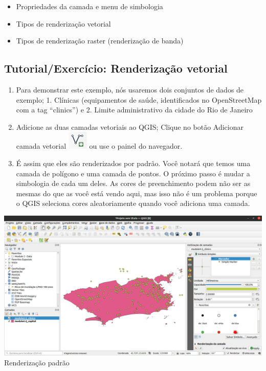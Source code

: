 \documentclass[
]{krantz}
\providecommand{\tightlist}{%
  \setlength{\itemsep}{0pt}\setlength{\parskip}{0pt}}
\begin{document}
\begin{itemize}
\tightlist
\item
  Propriedades da camada e menu de simbologia
\item
  Tipos de renderização vetorial
\item
  Tipos de renderização raster (renderização de banda)
\end{itemize}

\hypertarget{tutorialexercuxedcio-renderizauxe7uxe3o-vetorial}{%
\subsection{Tutorial/Exercício: Renderização vetorial}\label{tutorialexercuxedcio-renderizauxe7uxe3o-vetorial}}

\begin{enumerate}
\def\labelenumi{\arabic{enumi}.}
\tightlist
\item
  Para demonstrar este exemplo, nós usaremos dois conjuntos de dados de exemplo; 1. Clínicas (equipamentos de saúde, identificados no OpenStreetMap com a tag ``clinics'') e 2. Limite administrativo da cidade do Rio de Janeiro
\item
  Adicione as duas camadas vetoriais ao QGIS; Clique no botão Adicionar camada vetorial \includegraphics{media/modulo4/add-vector.png} ou use o painel do navegador.
\item
  É assim que eles são renderizados por padrão. Você notará que temos uma camada de polígono e uma camada de pontos. O próximo passo é mudar a simbologia de cada um deles. As cores de preenchimento podem não ser as mesmas do que as você está vendo aqui, mas isso não é um problema porque o QGIS seleciona cores aleatoriamente quando você adiciona uma camada.
\end{enumerate}

\includegraphics{media/modulo4/default-vector-render.png}Renderização padrão
\end{document}
